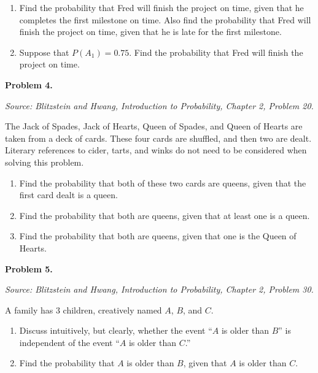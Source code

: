 \documentclass[11pt]{article}
\newcommand{\source}[1]{%
    \vspace{0.15cm}
    {\small\textit{Source: Blitzstein and Hwang, \textit{Introduction to Probability}, Chapter 2, Problem #1.}}
}
\begin{document}
\begin{enumerate}[label=(\alph*), leftmargin=*]
    \item Find the probability that Fred will finish the project on time, given that he completes the first milestone on time. Also find the probability that Fred will finish the project on time, given that he is late for the first milestone.

    \item Suppose that $P(A_1)=0.75$. Find the probability that Fred will finish the project on time.
\end{enumerate}

\vfill


\newpage


\begin{problemheader}
\textbf{Problem 4.}
\end{problemheader}
\source{20}

The Jack of Spades, Jack of Hearts, Queen of Spades, and Queen of Hearts are taken from a deck of cards. These four cards are shuffled, and then two are dealt. Literary references to cider, tarts, and winks do not need to be considered when solving this problem.

\begin{enumerate}[label=(\alph*), leftmargin=*]
    \item Find the probability that both of these two cards are queens, given that the first card dealt is a queen.

    \item Find the probability that both are queens, given that at least one is a queen.

    \item Find the probability that both are queens, given that one is the Queen of Hearts.
\end{enumerate}

\vfill


\newpage


\begin{problemheader}
\textbf{Problem 5.}
\end{problemheader}
\source{30}

A family has 3 children, creatively named $A$, $B$, and $C$.

\begin{enumerate}[label=(\alph*), leftmargin=*]
    \item Discuss intuitively, but clearly, whether the event ``$A$ is older than $B$'' is independent of the event ``$A$ is older than $C$.''

    \item Find the probability that $A$ is older than $B$, given that $A$ is older than $C$.
\end{enumerate}
\end{document}
